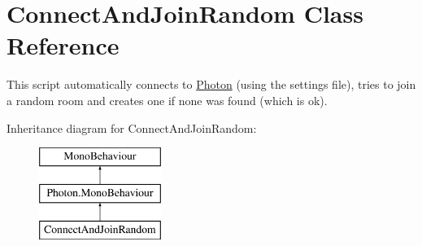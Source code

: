 \hypertarget{class_connect_and_join_random}{}\section{Connect\+And\+Join\+Random Class Reference}
\label{class_connect_and_join_random}


This script automatically connects to \hyperlink{namespace_photon}{Photon} (using the settings file), tries to join a random room and creates one if none was found (which is ok).  


Inheritance diagram for Connect\+And\+Join\+Random\+:\begin{figure}[H]
\begin{center}
\leavevmode
\includegraphics[height=3.000000cm]{class_connect_and_join_random}
\end{center}
\end{figure}
